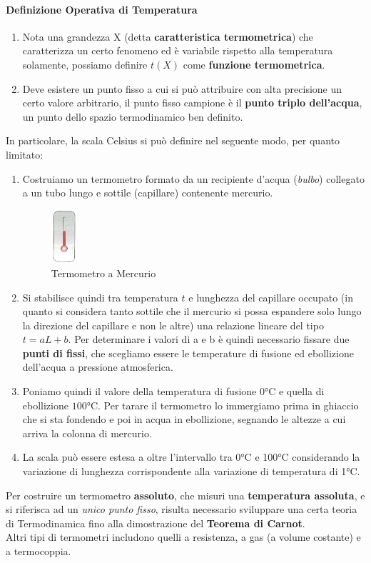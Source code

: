 \documentclass{article}
\begin{document}
\paragraph{Definizione Operativa di Temperatura}
\begin{enumerate}
    \item Nota una grandezza X (detta \textbf{caratteristica termometrica}) che caratterizza un certo fenomeno ed è variabile rispetto alla temperatura solamente, possiamo definire $t(X)$ come \textbf{funzione termometrica}.
    \item Deve esistere un punto fisso a cui si può attribuire con alta precisione un certo valore arbitrario, il punto fisso campione è il \textbf{punto triplo dell'acqua}, un punto dello spazio termodinamico ben definito. 
\end{enumerate}
In particolare, la scala Celsius si può definire nel seguente modo, per quanto limitato:
\begin{enumerate}
    \item Costruiamo un termometro formato da un recipiente d'acqua (\textit{bulbo}) collegato a un tubo lungo e sottile (capillare) contenente mercurio.
    \begin{figure}[H]
        \centering
        \includegraphics[width=0.09\textwidth]{DefTemp1.png}
        \caption{Termometro a Mercurio}
    \end{figure}
    \item Si stabilisce quindi tra temperatura $t$ e lunghezza del capillare occupato (in quanto si considera tanto sottile che il mercurio si possa espandere solo lungo la direzione del capillare e non le altre) una relazione lineare del tipo $t=aL+b$. Per determinare i valori di a e b è quindi necessario fissare due \textbf{punti di fissi}, che scegliamo essere le temperature di fusione ed ebollizione dell'acqua a pressione atmosferica.
    \item Poniamo quindi il valore della temperatura di fusione $0\si{\degreeCelsius}$ e quella di ebollizione $100\si{\degreeCelsius}$. Per tarare il termometro lo immergiamo prima in ghiaccio che si sta fondendo e poi in acqua in ebollizione, segnando le altezze a cui arriva la colonna di mercurio.
    \item La scala può essere estesa a oltre l'intervallo tra 0\si{\degreeCelsius} e 100\si{\degreeCelsius} considerando la variazione di lunghezza corrispondente alla variazione di temperatura di 1\si{\degreeCelsius}.
\end{enumerate}
Per costruire un termometro \textbf{assoluto}, che misuri una \textbf{temperatura assoluta}, e si riferisca ad un \textit{unico punto fisso}, risulta necessario sviluppare una certa teoria di Termodinamica fino alla dimostrazione del \textbf{Teorema di Carnot}.\\
Altri tipi di termometri includono quelli a resistenza, a gas (a volume costante) e a termocoppia. \\
\end{document}
